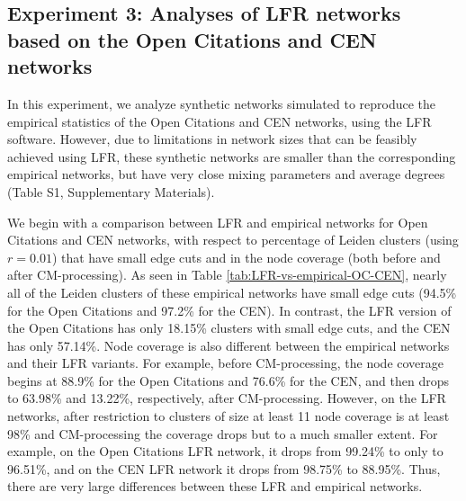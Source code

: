 \documentclass[11pt]{article}   	%
\begin{document}


\subsection{Experiment 3: Analyses of LFR networks based on the Open Citations and CEN networks}



In this experiment, we analyze synthetic networks simulated to reproduce the empirical statistics of the Open Citations and CEN networks, using the
LFR software.
However, due to limitations in network sizes that can be feasibly achieved using LFR, these synthetic networks are smaller than the corresponding
empirical networks, but have very close mixing parameters and average degrees (Table S1, Supplementary Materials). 


We begin with a comparison  between LFR and empirical networks for Open Citations and CEN networks, with respect to percentage of  Leiden clusters (using $r=0.01$) that have small edge cuts and in
the node coverage (both before and after CM-processing).   As seen in
Table \ref{tab:LFR-vs-empirical-OC-CEN}, nearly all of the Leiden clusters of these empirical networks have small edge cuts (94.5\% for the Open Citations and 97.2\% for the CEN).
In contrast,  the LFR version of the Open Citations has only 18.15\% clusters with small edge cuts, and the CEN has only 57.14\%.  
Node coverage is also different between the empirical networks and their LFR variants.
For example, before CM-processing, the node coverage begins at 88.9\% for the Open Citations and 76.6\% for the CEN, and then drops to 63.98\% and 13.22\%, respectively, after CM-processing. 
However, on the LFR networks, after restriction to clusters of size at least 11 node coverage is at least 98\%  and CM-processing the coverage drops but to a much smaller
extent. For example, on the Open Citations LFR network, it drops from 99.24\% to only to 96.51\%, and on the CEN LFR network it drops from 98.75\% to 88.95\%.
Thus, there are very large differences between these LFR and empirical networks.
\end{document}
